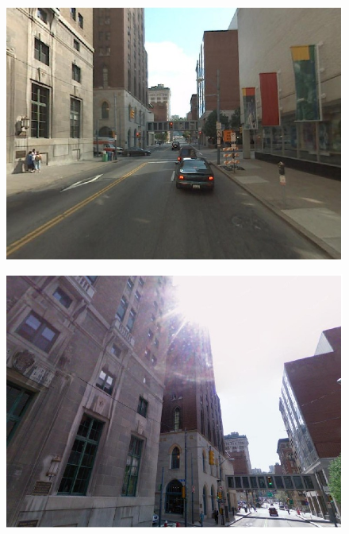 \begin{figure}[!ht]
{\begin{minipage}{\subw}
{		  \includegraphics[width=1.05\linewidth]{imgs/demo01b.jpg}
		  }
		\end{minipage}
	 }
	 \hspace{3mm}
	 \colorbox{myGreen}{
		\begin{minipage}{\subw}
		  \centerline{
		  \includegraphics[width=1.05\linewidth]{imgs/demo02b.jpg}
		  }
		\end{minipage}
	 }
	 \colorbox{myRed}{
		\begin{minipage}{\subw}
		  \centerline{
}
\end{minipage}}
\end{figure}
